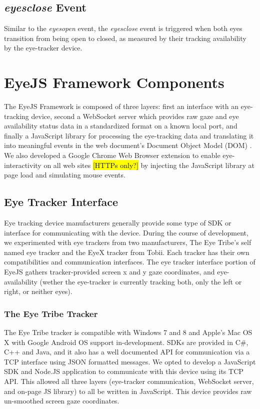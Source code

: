 \documentclass{sigchi}
\begin{document}
\subsection{\textbf{\textit{eyesclose}} Event}
Similar to the \textit{eyesopen} event, the \textit{eyesclose} event is triggered when both eyes transition from being open to closed, as measured by their tracking availability by the eye-tracker device.



\section{EyeJS Framework Components}
The EyeJS Framework is composed of three layers: first an interface with an eye-tracking device, second a WebSocket server \cite{websocket} which provides raw gaze and eye availability status data in a standardized format on a known local port, and finally a JavaScript library for processing the eye-tracking data and translating it into meaningful events in the web document's Document Object Model (DOM) \cite{domlevel1, domlevel2}. We also developed a Google Chrome Web Browser extension \cite{chromeextensions} to enable eye-interactivity on all web sites \hl{[HTTPs only?]} by injecting the JavaScript library at page load and simulating mouse events.


\subsection{Eye Tracker Interface}
Eye tracking device manufacturers generally provide some type of SDK or interface for communicating with the device. During the course of development, we experimented with eye trackers from two manufacturers, The Eye Tribe's self named eye tracker and the EyeX tracker from Tobii. Each tracker has their own compatibilities and communication interfaces. The eye tracker interface portion of EyeJS gathers tracker-provided screen x and y gaze coordinates, and eye-availability (wether the eye-tracker is currently tracking both, only the left or right, or neither eyes).


\subsubsection{The Eye Tribe Tracker}
The Eye Tribe tracker is compatible with Windows 7 and 8 and Apple's Mac OS X with Google Android OS support in-development. SDKs are provided in C\#, C++ and Java, and it also has a well documented API for communication via a TCP interface using JSON formatted messages. We opted to develop a JavaScript SDK and Node.JS application to communicate with this device using its TCP API. This allowed all three layers (eye-tracker communication, WebSocket server, and on-page JS library) to all be written in JavaScript. This device provides raw un-smoothed screen gaze coordinates.
\end{document}
